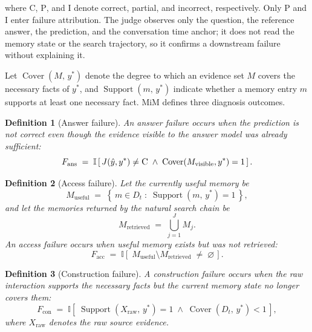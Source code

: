 \documentclass[11pt]{article}
\newtheorem{definition}{Definition}[section]
\newcommand{\II}{\mathbb{I}}
\DeclareMathOperator{\Cover}{Cover}
\DeclareMathOperator{\Support}{Support}
\begin{document}
\noindent where \textsc{C}, \textsc{P}, and \textsc{I} denote correct, partial,
and incorrect, respectively. Only \textsc{P} and \textsc{I} enter failure
attribution. The judge observes only the question, the reference answer, the
prediction, and the conversation time anchor; it does not read the memory state
or the search trajectory, so it confirms a downstream failure without explaining
it.

Let $\Cover(M,\,y^{*})$ denote the degree to which an evidence set $M$ covers the
necessary facts of $y^{*}$, and $\Support(m,\,y^{*})$ indicate whether a memory
entry $m$ supports at least one necessary fact. MiM defines three diagnosis
outcomes.

\begin{definition}[Answer failure]
\label{def:ans}
An \emph{answer failure} occurs when the prediction is not correct even though
the evidence visible to the answer model was already sufficient:
\begin{equation}
\label{eq:fans}
F_{\mathrm{ans}} \;=\; \II\left[\,J(\hat{y},y^{*})\neq \textsc{C}
\;\land\; \Cover(M_{\mathrm{visible}}, y^{*}) = 1\,\right].
\end{equation}
\end{definition}

\begin{definition}[Access failure]
\label{def:acc}
Let the currently useful memory be
\begin{equation}
\label{eq:museful}
M_{\mathrm{useful}} \;=\; \left\{\, m \in D_t \;:\;
\Support(m,\,y^{*}) = 1 \,\right\},
\end{equation}
\noindent and let the memories returned by the natural search chain be
\begin{equation}
\label{eq:mretrieved}
M_{\mathrm{retrieved}} \;=\; \bigcup_{j=1}^{J} M_j .
\end{equation}
\noindent An \emph{access failure} occurs when useful memory exists but was not
retrieved:
\begin{equation}
\label{eq:facc}
F_{\mathrm{acc}} \;=\; \II\left[\;
M_{\mathrm{useful}} \setminus M_{\mathrm{retrieved}} \;\neq\; \varnothing
\,\right].
\end{equation}
\end{definition}

\begin{definition}[Construction failure]
\label{def:con}
A \emph{construction failure} occurs when the raw interaction supports the
necessary facts but the current memory state no longer covers them:
\begin{equation}
\label{eq:fcon}
F_{\mathrm{con}} \;=\; \II\left[\;
\Support(X_{\mathrm{raw}},\,y^{*}) = 1
\;\land\; \Cover(D_t,\,y^{*}) < 1 \,\right],
\end{equation}
\noindent where $X_{\mathrm{raw}}$ denotes the raw source evidence.
\end{definition}
\end{document}

